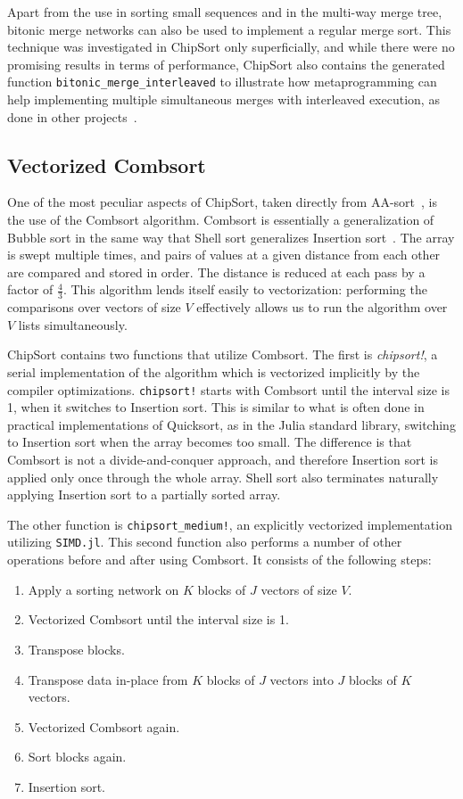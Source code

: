 \documentclass{juliacon}
\begin{document}
Apart from the use in sorting small sequences and in the multi-way merge tree, bitonic merge networks can also be used to implement a regular merge sort. This technique was investigated in ChipSort only superficially, and while there were no promising results in terms of performance, ChipSort also contains the generated function {\tt bitonic\_merge\_interleaved} to illustrate how metaprogramming can help implementing multiple simultaneous merges with interleaved execution, as done in other projects~\cite{DBLP:journals/pvldb/ChhuganiNLMHCBKD08}.

\subsection{Vectorized Combsort}
%
One of the most peculiar aspects of ChipSort, taken directly from AA-sort~\cite{DBLP:conf/IEEEpact/InoueMKN07,DBLP:journals/pvldb/InoueT15}, is the use of the Combsort algorithm. Combsort is essentially a generalization of Bubble sort in the same way that Shell sort generalizes Insertion sort~\cite{dobosiewicz1980efficient,Lacey:1991:FES:117187.117218,DBLP:books/lib/Knuth98a,DBLP:books/daglib/0023376,INCERPI198737}. The array is swept multiple times, and pairs of values at a given distance from each other are compared and stored in order. The distance is reduced at each pass by a factor of $\frac{4}{3}$. This algorithm lends itself easily to vectorization: performing the comparisons over vectors of size $V$ effectively allows us to run the algorithm over $V$ lists simultaneously.

ChipSort contains two functions that utilize Combsort. The first is {\em chipsort!}, a serial implementation of the algorithm which is vectorized implicitly by the compiler optimizations. {\tt chipsort!} starts with Combsort until the interval size is 1, when it switches to Insertion sort. This is similar to what is often done in practical implementations of Quicksort, as in the Julia standard library, switching to Insertion sort when the array becomes too small. The difference is that Combsort is not a divide-and-conquer approach, and therefore Insertion sort is applied only once through the whole array. Shell sort also terminates naturally applying Insertion sort to a partially sorted array.

The other function is {\tt chipsort\_medium!}, an explicitly vectorized implementation utilizing {\tt SIMD.jl}. This second function also performs a number of other operations before and after using Combsort. It consists of the following steps:
\begin{enumerate}
\item Apply a sorting network on $K$ blocks of $J$ vectors of size $V$.
\item Vectorized Combsort until the interval size is 1.
\item Transpose blocks.
\item Transpose data in-place from $K$ blocks of $J$ vectors into $J$ blocks of $K$ vectors.
\item Vectorized Combsort again.
\item Sort blocks again.
\item Insertion sort.
\end{enumerate}
\end{document}
